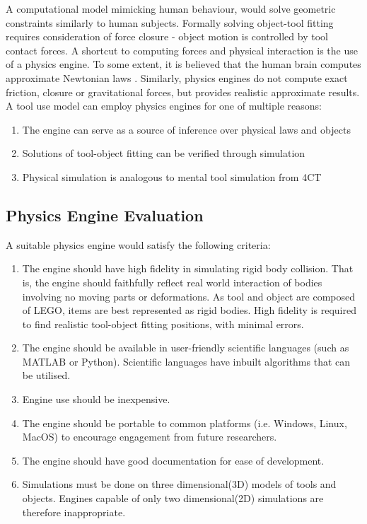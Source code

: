 \documentclass[11]{article}
\begin{document}
A computational model mimicking human behaviour, would solve geometric constraints similarly to human subjects.
Formally solving object-tool fitting requires consideration of force closure - object motion is controlled by tool contact forces.
A shortcut to computing forces and physical interaction is the use of a physics engine. 
To some extent, it is believed that the human brain computes approximate Newtonian laws \cite{battaglia2013}. 
Similarly, physics engines do not compute exact friction, closure or gravitational forces, but provides realistic approximate results. 
A tool use model can employ physics engines for one of multiple reasons:
\begin{enumerate}
\itemsep0em 
\item The engine can serve as a source of inference over physical laws and objects 
\item Solutions of tool-object fitting can be verified through simulation
\item Physical simulation is analogous to mental tool simulation from 4CT
\end{enumerate}

\subsection{Physics Engine Evaluation}

A suitable physics engine would satisfy the following criteria:
\begin{enumerate}
\item The engine should have high fidelity in simulating rigid body collision. 
That is, the engine should faithfully reflect real world interaction of bodies involving no moving parts or deformations.
As tool and object are composed of LEGO, items are best represented as rigid bodies.   
High fidelity is required to find realistic tool-object fitting positions, with minimal errors.
\item The engine should be available in user-friendly scientific languages (such as MATLAB or Python). 
Scientific languages have inbuilt algorithms that can be utilised.
\item Engine use should be inexpensive.
\item The engine should be portable to common platforms (i.e. Windows, Linux, MacOS) to encourage engagement from future researchers.
\item The engine should have good documentation for ease of development.
\item Simulations must be done on three dimensional(3D) models of tools and objects.
Engines capable of only two dimensional(2D) simulations are therefore inappropriate.  
\end{enumerate}
\end{document}
